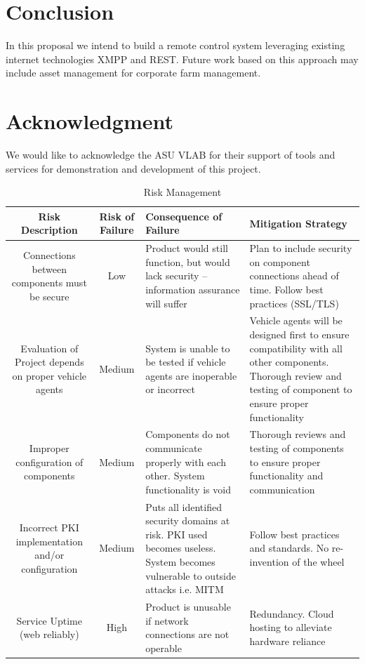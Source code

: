 \documentclass[conference,12pt]{IEEEtran}
\begin{document}
\section{Conclusion}
In this proposal we intend to build a remote control system leveraging existing
internet technologies XMPP and REST. Future work based on this approach may
include asset management for corporate farm management.

\section{Acknowledgment}
We would like to acknowledge the ASU VLAB for their support of tools and
services for demonstration and development of this project.

\printbibliography
\clearpage
\begin{landscape}
\begin{table}%
\caption{Risk Management}
\label{tab:riskmanagement}
\centering
\begin{tabular}{c||c||p{2in}||p{2in}}
\hline
\bfseries Risk Description & \bfseries Risk of Failure & \bfseries Consequence of Failure & \bfseries Mitigation Strategy\\
\hline\hline
Connections between components must be secure
& Low
& Product would still function, but would lack security – information assurance will suffer
& Plan to include security on component connections ahead of time. Follow best practices (SSL/TLS)\\
\hline
Evaluation of Project depends on proper vehicle agents
& Medium
& System is unable to be tested if vehicle agents are inoperable or incorrect
& Vehicle agents will be designed first to ensure compatibility with all other components. Thorough review and testing of component to ensure proper functionality\\
\hline
Improper configuration of components
& Medium
& Components do not communicate properly with each other. System functionality is void
& Thorough reviews and testing of components to ensure proper functionality and communication\\
\hline
Incorrect PKI implementation and/or configuration
& Medium
& Puts all identified security domains at risk. PKI used becomes useless. System becomes vulnerable to outside attacks i.e. MITM
& Follow best practices and standards. No re-invention of the wheel\\
\hline
Service Uptime (web reliably)
& High
& Product is unusable if network connections are not operable
& Redundancy. Cloud hosting to alleviate hardware reliance\\
\hline
\end{tabular}
\end{table}
\end{landscape}
\end{document}
